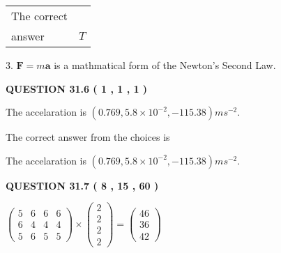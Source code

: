 \documentclass[12pt]{article}
\begin{document}
\noindent\begin{tabular}{|l|l|}\hline The correct & \\
          answer &  %
$T$ \\ \hline \end{tabular}
3.  %
$\mathbf{F}=m\mathbf{a}$ is a mathmatical form of  %
the Newton's Second Law.
 
 
 
  
\vspace{0.2in}
  
{\textbf{\Large{QUESTION
31.6 
 (           1 ,           1 ,           1 )
}}}
  
  


 
 
\noindent{}
 
 
The accelaration is $  %
(
0.769,
5.8 \times 10^{-2},
-115.38)
ms^{-2} $.
 
 
 
 
 
 
\noindent{}

The correct answer from the choices is


The accelaration is $  %
(
0.769,
5.8 \times 10^{-2},
-115.38)
ms^{-2} $.
 
 
 
  
\vspace{0.2in}
  
{\textbf{\Large{QUESTION
31.7 
 (           8 ,          15 ,          60 )
}}}
  
  
 
 
\noindent{}

 
$\left( \begin{array}{ccccccccccccccc}
           5  & 
           6  & 
           6  & 
           6  \\ 
           6  & 
           4  & 
           4  & 
           4  \\ 
           5  & 
           6  & 
           5  & 
           5
\end{array}\right) \times
\left( \begin{array}{c}
           2  \\ 
           2  \\ 
           2  \\ 
           2
\end{array}\right)  =
\left( \begin{array}{c}
          46  \\ 
          36  \\ 
          42
\end{array}\right)  $
 
\end{document}
